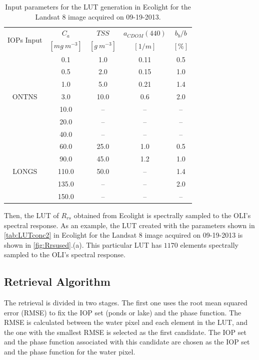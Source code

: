 \documentclass[onecolumn,3p,letterpaper,11pt]{elsarticle}
\begin{document}
\begin{table}[htb]
\caption{Input parameters for the LUT generation in Ecolight for the Landsat 8 image acquired on 09-19-2013. \label{tab:LUTconc2}} 
\small
\centering
    \begin{tabular}{ccccc}
    \hline \hline
    \multirow{2}{*}{IOPs Input} & \bfseries{$C_a$}    & \bfseries{$TSS$}  & \bfseries{$a_{CDOM}(440)$} & \bfseries{$b_b/b$}\\
               & $[mg~m^{-3}]$      & $[g~m^{-3}]$      &   $[1/m]$                  &  $[\%]$           \\ \hline \hline
\multirow{7}{*}{ONTNS} & 0.1   & 1.0  &  0.11 &  0.5 \\
                       & 0.5   & 2.0  &  0.15 &  1.0 \\
                       & 1.0   & 5.0  &  0.21 &  1.4 \\
                       & 3.0   & 10.0 &  0.6  &  2.0 \\
                       & 10.0  & --   &  --   &  --  \\
                       & 20.0  & --   &  --   &  --  \\
                       & 40.0  & --   &  --   &  --  \\ \hline

\multirow{5}{*}{LONGS} & 60.0  & 25.0 & 1.0   &  0.5 \\  
                       & 90.0  & 45.0 & 1.2   &  1.0 \\  
                       & 110.0 & 50.0 & --    &  1.4 \\  
                       & 135.0 & --   & --    &  2.0 \\  
                       & 150.0 & --   & --    &  --  \\  \hline \hline    
    \end{tabular}
	\end{table}

Then, the LUT of $R_{rs}$ obtained from Ecolight is spectrally sampled to the OLI's spectral response. As an example, the LUT created with the parameters shown in \autoref{tab:LUTconc2} in Ecolight for the Landsat 8 image acquired on 09-19-2013 is shown in \autoref{fig:Rrsused}.(a). This particular LUT has $1170$ elements spectrally sampled to the OLI's spectral response.

\subsection{Retrieval Algorithm} 
\label{subsec:Retrieval}
The retrieval is divided in two stages. The first one uses the root mean squared error (RMSE) to fix the IOP set (ponds or lake) and the phase function. The RMSE is calculated between the water pixel and each element in the LUT, and the one with the smallest RMSE is selected as the first candidate. The IOP set and the phase function associated with this candidate are chosen as the IOP set and the phase function for the water pixel.
\end{document}
